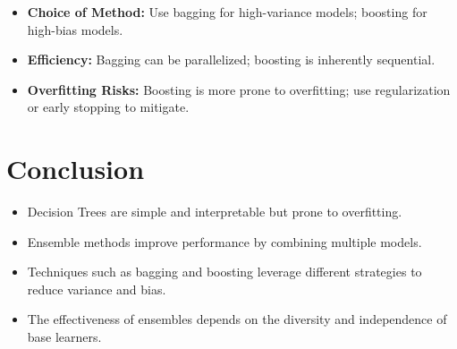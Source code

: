 \documentclass[10pt]{article}
\begin{document}
\begin{itemize}
    \item \textbf{Choice of Method:} Use bagging for high-variance models; boosting for high-bias models.
    \item \textbf{Efficiency:} Bagging can be parallelized; boosting is inherently sequential.
    \item \textbf{Overfitting Risks:} Boosting is more prone to overfitting; use regularization or early stopping to mitigate.
\end{itemize}

\section{Conclusion}

\begin{itemize}
    \item Decision Trees are simple and interpretable but prone to overfitting.
    \item Ensemble methods improve performance by combining multiple models.
    \item Techniques such as bagging and boosting leverage different strategies to reduce variance and bias.
    \item The effectiveness of ensembles depends on the diversity and independence of base learners.
\end{itemize}
\end{document}
